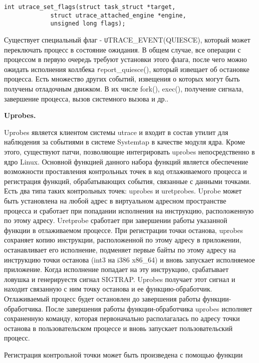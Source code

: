 \bigskip
\begin{lstlisting}
int utrace_set_flags(struct task_struct *target,
			 struct utrace_attached_engine *engine,
			 unsigned long flags);

\end{lstlisting}

\bigskip 
Существует специальный флаг - {\texttt UTRACE\_EVENT(QUIESCE)}, 
который может переключать процесс в состояние ожидания. В общем 
случае, все операции с процессом в первую очередь требуют 
установки этого флага, после чего можно ожидать исполнения 
коллбека {\texttt report\_quiesce()}, который извещает об 
остановке процесса. Есть множество других событий, извещения 
о которых могут быть получены отладочным движком. В их числе 
fork(), exec(), получение сигнала, завершение процесса, вызов 
системного вызова и др..

\bigskip
{\bfseries Uprobes.}

\bigskip
Uprobes является клиентом системы utrace и входит в состав утилит для 
наблюдения за событиями в системе Systemtap в качестве модуля ядра. 
Кроме этого, существуют патчи, позволяющие интегрировать uprobes 
непосредственно в ядро Linux. Основной функцией данного набора функций 
является обеспечение возможности проставления контрольных точек в код 
отлаживаемого процесса и регистрация функций, обрабатывающих события, 
связанные с данными точками. Есть два типа таких контрольных точек: 
uprobes и uretprobes. Uprobe может быть установлена на любой адрес в 
виртуальном адресном пространстве процесса и сработает при попадании 
исполнения на инструкцию, расположенную по этому адресу. Uretprobe 
сработает при завершении работы указанной функции в отлаживаемом 
процессе. При регистрации точки останова, uprobes сохраняет копию 
инструкции, расположенной по этому адресу в приложении, останавливает 
его исполнение, подменяет первые байты по этому адресу на инструкцию 
точки останова (int3 на i386 x86\_64) и вновь запускает исполняемое 
приложение. Когда исполнение попадает на эту инструкцию, срабатывает 
ловушка и генерируестя сигнал SIGTRAP. Uprobes получает этот сигнал и 
находит связанную с ним точку останова и ее функцию-обработчик. 
Отлаживаемый процесс будет остановлен до завершения работы 
функции-обработчика. После завершения работы функции-обработчика uprobes 
исполняет сохраненную команду, которая первоначально располагалась 
по адресу точки останова в пользовательском процессе и вновь запускает 
пользовательский процесс.   

Регистрация контрольной точки может быть произведена с помощью функции
 

